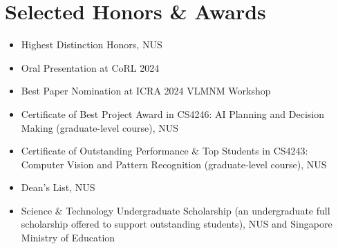 \section{Selected Honors \& Awards}
\begin{itemize}
  \item Highest Distinction Honors, NUS
  \item Oral Presentation at CoRL 2024
  \item Best Paper Nomination at ICRA 2024 VLMNM Workshop
  \item Certificate of Best Project Award in CS4246: AI Planning and Decision Making (graduate-level course), NUS
  \item Certificate of Outstanding Performance \& Top Students in CS4243: Computer Vision and Pattern Recognition (graduate-level course), NUS
  \item Dean's List, NUS
  \item Science \& Technology Undergraduate Scholarship (an undergraduate full scholarship offered to support outstanding students), NUS and Singapore Ministry of Education
\end{itemize}
